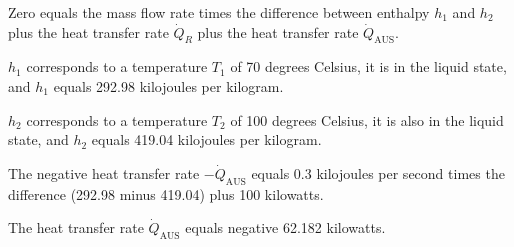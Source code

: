 Zero equals the mass flow rate times the difference between enthalpy \( h_1 \) and \( h_2 \) plus the heat transfer rate \( \dot{Q}_R \) plus the heat transfer rate \( \dot{Q}_{\text{AUS}} \).

\( h_1 \) corresponds to a temperature \( T_1 \) of 70 degrees Celsius, it is in the liquid state, and \( h_1 \) equals 292.98 kilojoules per kilogram.

\( h_2 \) corresponds to a temperature \( T_2 \) of 100 degrees Celsius, it is also in the liquid state, and \( h_2 \) equals 419.04 kilojoules per kilogram.

The negative heat transfer rate \( -\dot{Q}_{\text{AUS}} \) equals 0.3 kilojoules per second times the difference (292.98 minus 419.04) plus 100 kilowatts.

The heat transfer rate \( \dot{Q}_{\text{AUS}} \) equals negative 62.182 kilowatts.